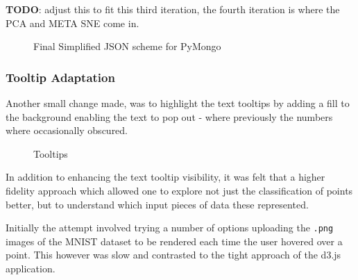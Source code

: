 \documentclass[a4paper,11pt,titlepage]{article}
\begin{document}
	\textbf{TODO}: adjust this to fit this third iteration, the fourth iteration is where the PCA and META SNE come in.
	
	\begin{figure}[H]
    			\caption{Final Simplified JSON scheme for PyMongo}%
	\end{figure}
	
	\subsubsection{Tooltip Adaptation}
	Another small change made, was to highlight the text tooltips by adding a fill to the background enabling the text to pop out - where previously the numbers where occasionally obscured.
	\par 
	
	\begin{figure}[H]
    			\caption{Tooltips}%
	\end{figure}	
	
	In addition to enhancing the text tooltip visibility, it was felt that a higher fidelity approach which allowed one to explore not just the classification of points better, but to understand which input pieces of data these represented. 
	\par 
	Initially the attempt involved trying a number of options uploading the \texttt{.png} images of the MNIST dataset to be rendered each time the user hovered over a point. This however was slow and contrasted to the tight approach of the d3.js application. 
	
\end{document}
